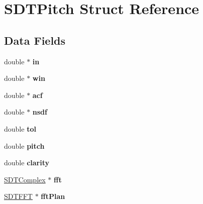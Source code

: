 \hypertarget{struct_s_d_t_pitch}{}\section{S\+D\+T\+Pitch Struct Reference}
\label{struct_s_d_t_pitch}
\subsection*{Data Fields}
\begin{DoxyCompactItemize}
\item 
\hypertarget{struct_s_d_t_pitch_a88b879aa32e1373f5e19154d3d583fd3}{}double $\ast$ {\bfseries in}\label{struct_s_d_t_pitch_a88b879aa32e1373f5e19154d3d583fd3}

\item 
\hypertarget{struct_s_d_t_pitch_a0db7743ca63ebec1838ca74753ac8894}{}double $\ast$ {\bfseries win}\label{struct_s_d_t_pitch_a0db7743ca63ebec1838ca74753ac8894}

\item 
\hypertarget{struct_s_d_t_pitch_a25ecf3c7d1097913a2bcfdff2e71ad53}{}double $\ast$ {\bfseries acf}\label{struct_s_d_t_pitch_a25ecf3c7d1097913a2bcfdff2e71ad53}

\item 
\hypertarget{struct_s_d_t_pitch_ab8641cac022acc89c542199ce2455278}{}double $\ast$ {\bfseries nsdf}\label{struct_s_d_t_pitch_ab8641cac022acc89c542199ce2455278}

\item 
\hypertarget{struct_s_d_t_pitch_a2687e4b3cb5da7dbd00e565343f66c6c}{}double {\bfseries tol}\label{struct_s_d_t_pitch_a2687e4b3cb5da7dbd00e565343f66c6c}

\item 
\hypertarget{struct_s_d_t_pitch_a34c057a0378030db67bd6a129f37d938}{}double {\bfseries pitch}\label{struct_s_d_t_pitch_a34c057a0378030db67bd6a129f37d938}

\item 
\hypertarget{struct_s_d_t_pitch_aeed6d4515ece64c0e8e900ed2a216749}{}double {\bfseries clarity}\label{struct_s_d_t_pitch_aeed6d4515ece64c0e8e900ed2a216749}

\item 
\hypertarget{struct_s_d_t_pitch_a7e589d9786add9b620c91b7a0cf7d23b}{}\hyperlink{struct_s_d_t_complex}{S\+D\+T\+Complex} $\ast$ {\bfseries fft}\label{struct_s_d_t_pitch_a7e589d9786add9b620c91b7a0cf7d23b}

\item 
\hypertarget{struct_s_d_t_pitch_a5836fe5aaa18b98a34a60e728aeaab61}{}\hyperlink{struct_s_d_t_f_f_t}{S\+D\+T\+F\+F\+T} $\ast$ {\bfseries fft\+Plan}\label{struct_s_d_t_pitch_a5836fe5aaa18b98a34a60e728aeaab61}


\end{DoxyCompactItemize}
